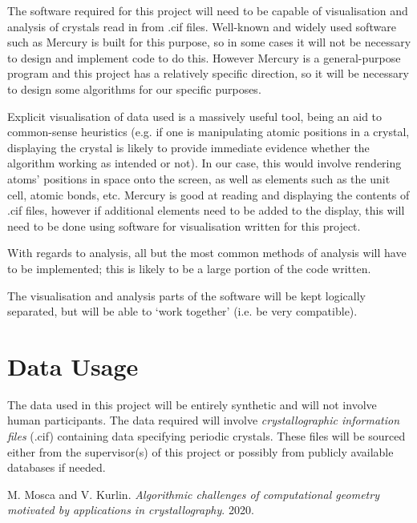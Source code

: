 \documentclass[12pt]{article}
\begin{document}
The software required for this project will need to be capable of visualisation and analysis of crystals read in from .cif files. Well-known and widely used software such as Mercury is built for this purpose, so in some cases it will not be necessary to design and implement code to do this. However Mercury is a general-purpose program and this project has a relatively specific direction, so it will be necessary to design some algorithms for our specific purposes.

Explicit visualisation of data used is a massively useful tool, being an aid to common-sense heuristics (e.g. if one is manipulating atomic positions in a crystal, displaying the crystal is likely to provide immediate evidence whether the algorithm working as intended or not). In our case, this would involve rendering atoms' positions in space onto the screen, as well as elements such as the unit cell, atomic bonds, etc. Mercury is good at reading and displaying the contents of .cif files, however if additional elements need to be added to the display, this will need to be done using software for visualisation written for this project.

With regards to analysis, all but the most common methods of analysis will have to be implemented; this is likely to be a large portion of the code written.

The visualisation and analysis parts of the software will be kept logically separated, but will be able to `work together' (i.e. be very compatible).

\section{Data Usage}

The data used in this project will be entirely synthetic and will not involve human participants. The data required will involve \emph{crystallographic information files} (.cif) containing data  specifying periodic crystals. These files will be sourced either from the supervisor(s) of this project or possibly from publicly available databases if needed.

\begin{thebibliography}{9}
M. Mosca and V. Kurlin. \emph{Algorithmic challenges of computational geometry motivated by applications in crystallography}. 2020.
\end{thebibliography}

 
\end{document}
